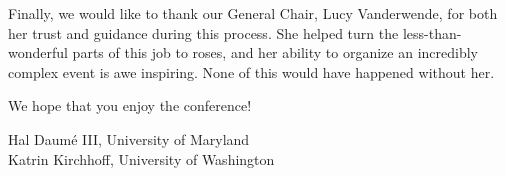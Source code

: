 \begin{large}
Finally, we would like to thank our General Chair, Lucy Vanderwende, for both her trust and guidance during this process. She helped turn the less-than-wonderful parts of this job to roses, and her ability to organize an incredibly complex event is awe inspiring. None of this would have happened without her.

We hope that you enjoy the conference!

\vspace{.2in}
Hal Daumé III, University of Maryland \\
\indent Katrin Kirchhoff, University of Washington

\end{large}
